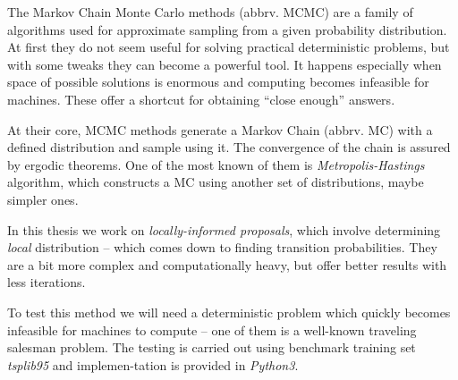 The Markov Chain Monte Carlo methods (abbrv. MCMC) are a family of algorithms used for approximate sampling from a given probability distribution. At first they do not seem useful for solving practical deterministic problems, but with some tweaks they can become a powerful tool. It happens especially when space of possible solutions is enormous and computing becomes infeasible for machines. These offer a shortcut for obtaining ``close enough'' answers.
		
At their core, MCMC methods generate a Markov Chain (abbrv. MC) with a defined distribution and sample using it. The convergence of the chain is assured by ergodic theorems. One of the most known of them is \textit{Metropolis-Hastings} algorithm, which constructs a MC using another set of distributions, maybe simpler ones.

In this thesis we work on \textit{locally-informed proposals}, which involve determining \textit{local} distribution -- which comes down to finding transition probabilities. They are a bit more complex and computationally heavy, but offer better results with less iterations. 

To test this method we will need a deterministic problem which quickly becomes infeasible for machines to compute -- one of them is a well-known traveling salesman problem. The testing is carried out using benchmark training set \textit{tsplib95} and implemen-tation is provided in \textit{Python3}.
